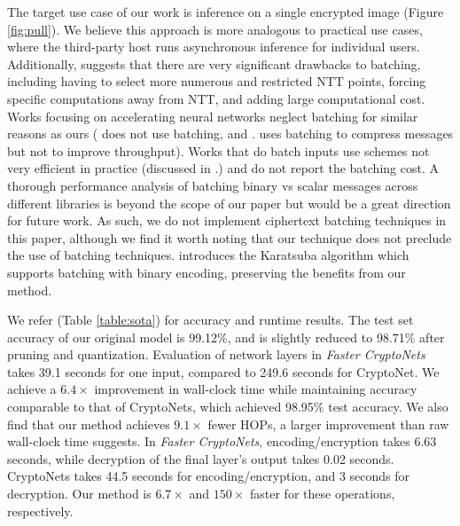 \documentclass[conference]{IEEEtran}
\begin{document}
The target use case of our work is inference on a single encrypted image (Figure \ref{fig:pull}).
We believe this approach is more analogous to practical use cases, where the third-party host runs asynchronous inference for individual users.
Additionally, \cite{Migliore:2017:HAH:3145508.3126558} suggests that there are very significant drawbacks to batching, including having to select more numerous and restricted NTT points, forcing specific computations away from NTT, and adding large computational cost.
Works focusing on accelerating neural networks neglect batching for similar reasons as ours (\cite{sanyal2018tapas} does not use batching, and \cite{florian2017fastdiscretize}. uses batching to compress messages but not to improve throughput). Works that do batch inputs use schemes not very efficient in practice (discussed in \cite{Migliore:2017:HAH:3145508.3126558}.) and do not report the batching cost. A thorough performance analysis of batching binary vs scalar messages across different libraries is beyond the scope of our paper but would be a great direction for future work. 
As such, we do not implement ciphertext batching techniques in this paper, although we find it worth noting that our technique does not preclude the use of batching techniques. \cite{Migliore:2017:HAH:3145508.3126558} introduces the Karatsuba algorithm which supports batching with binary encoding, preserving the benefits from our method. 


We refer (Table \ref{table:sota}) for accuracy and runtime results.
The test set accuracy of our original model is 99.12\%, and is slightly reduced to 98.71\% after pruning and quantization.
Evaluation of network layers in \textit{Faster CryptoNets} takes 39.1 seconds for one input, compared to 249.6 seconds for CryptoNet.  We achieve a $6.4\times$ improvement in wall-clock time while maintaining accuracy comparable to that of CryptoNets, which achieved 98.95\% test accuracy.  We also find that our method achieves $9.1 \times$ fewer HOPs, a larger improvement than raw wall-clock time suggests. 
In \textit{Faster CryptoNets}, encoding/encryption takes 6.63 seconds, while decryption of the final layer's output takes 0.02 seconds.
CryptoNets takes 44.5 seconds for encoding/encryption, and 3 seconds for decryption.
Our method is $6.7\times$ and $150\times$ faster for these operations, respectively.
\end{document}
